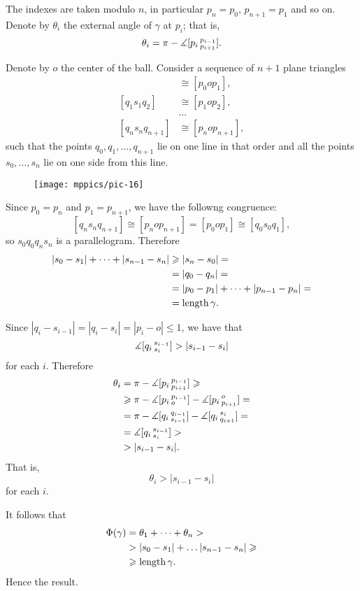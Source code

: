 The indexes are taken modulo $n$, in particular $p_{n}=p_0$, $p_{n+1}=p_1$ and so on.
Denote by $\theta_i$ the external angle of $\gamma$ at $p_i$;
that is,
\[\theta_i=\pi-\measuredangle[p_i\,{}^{p_{i-1}}_{p_{i+1}}].\]

Denote by $o$ the center of the ball.
Consider a sequence of $n+1$ plane triangles
\begin{align*}
[q_0s_0q_1]
&\cong 
[p_0op_1],
\\
[q_1s_1q_2]
&\cong 
[p_1op_2],
\\
&\dots
\\
[q_{n}s_nq_{n+1}]
&\cong 
[p_nop_{n+1}],
\end{align*}
such that the points $q_0,q_1,\dots,q_{n+1}$ lie on one line in that order and all the points $s_0,\dots,s_n$ lie on one side from this line.

\begin{figure}[h!]
\vskip-0mm
\centering
\texttt{[image: mppics/pic-16]}
\vskip0mm
\end{figure}

Since $p_0=p_n$ and $p_1=p_{n+1}$, we have the followng congruence:
\[[q_{n}s_nq_{n+1}]\cong 
[p_nop_{n+1}]=[p_0op_1]\cong[q_{0}s_0q_1],\]
so $s_0q_0q_ns_n$ is a parallelogram.
Therefore
\begin{align*}
|s_0-s_1|+\dots+|s_{n-1}-s_n|
&\geqslant|s_n-s_0|=
\\
&=|q_0-q_n|=
\\
&=|p_0-p_1|+\dots+|p_{n-1}-p_n|=
\\
&=\mathop{\rm length}\nolimits \gamma.
\end{align*}

Since $|q_i-s_{i-1}|=|q_i-s_i|=|p_i-o|\le 1$, we have that
\[\measuredangle[q_i\,{}^{s_{i-1}}_{s_i}]>|s_{i-1}-s_i|\]
for each $i$.
Therefore
\begin{align*}
\theta_i
&=
\pi
-
\measuredangle[p_i\,{}^{p_{i-1}}_{p_{i+1}}]
\geqslant
\\
&\geqslant\pi-\measuredangle[p_i\,{}^{p_{i-1}}_{o}]-\measuredangle[p_i\,{}^{o}_{p_{i+1}}]=
\\
&=\pi-\measuredangle[q_i\,{}^{q_{i-1}}_{s_{i-1}}]-\measuredangle[q_i\,{}^{s_i}_{q_{i+1}}]=
\\
&=\measuredangle[q_i\,{}^{s_{i-1}}_{s_i}]
>
\\
&>|s_{i-1}-s_i|.
\end{align*}
That is, 
\[\theta_i>|s_{i-1}-s_i|\]
for each $i$.

It follows that
\begin{align*}
\Phi({\gamma})
&=\theta_1+\dots+\theta_n>
\\
&> |s_{0}-s_1|+\dots |s_{n-1}-s_n|\geqslant 
\\
&\geqslant\mathop{\rm length}\nolimits \gamma.
\end{align*}
Hence the result.
\qeds


